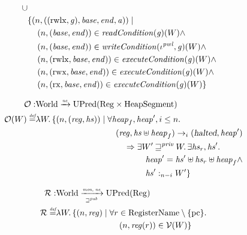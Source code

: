 \documentclass[a4paper]{article}
\newcommand{\nefun}{\xrightarrow{\textit{\tiny{ne}}}}
\newcommand{\defeq}{\stackrel{\textit{\tiny{def}}}{=}}
\newcommand{\union}{\mathbin{\cup}}
\newcommand{\var}[1]{\mathit{#1}}
\newcommand{\hs}{\var{hs}}
\newcommand{\gl}{\var{g}}
\newcommand{\pcreg}{\mathrm{pc}}
\newcommand{\addr}{\var{a}}
\newcommand{\start}{\var{base}}
\newcommand{\addrend}{\var{end}}
\newcommand{\reg}{\var{reg}}
\newcommand{\heap}{\var{heap}}
\newcommand{\perm}{\var{perm}}
\newcommand{\stdcap}[1][(\perm,\gl)]{\left(#1,\start,\addrend,\addr \right)}
\newcommand{\halted}{\textsl{halted}}
\newcommand{\plainfun}[2]{
  \ifthenelse{\equal{#2}{}}
             {\mathit{#1}}
             {\mathit{#1}(#2)}
}
\newcommand{\readCond}[1]{\plainfun{readCondition}{#1}}
\newcommand{\writeCond}[1]{\plainfun{writeCondition}{#1}}
\newcommand{\execCond}[1]{\plainfun{executeCondition}{#1}}
\newcommand{\futurewk}{\mathbin{\sqsupseteq}^{\var{pub}}}
\newcommand{\futurestr}{\mathbin{\sqsupseteq}^{\var{priv}}}
\newcommand{\heapSat}[3][\heap]{#1 :_{#2} #3}
\newcommand{\monwknefun}{\xrightarrow[\text{\tiny{$\futurewk$}}]{\textit{\tiny{mon, ne}}}}
\newcommand{\asmType}{\plaindom{AsmType}}
\newcommand{\plaindom}[1]{\mathrm{#1}}
\newcommand{\RegName}{\plaindom{RegisterName}}
\newcommand{\Regs}{\plaindom{Reg}}
\newcommand{\HeapSegments}{\plaindom{HeapSegment}}
\newcommand{\Worlds}{\plaindom{World}}
\newcommand{\UPred}[1]{\plaindom{UPred}(#1)}
\newcommand{\intr}[2]{\mathcal{#1}}
\newcommand{\valueintr}[1]{\intr{V}{#1}}
\newcommand{\regintr}[1]{\intr{R}{#1}}
\newcommand{\stdvr}{\valueintr{\asmType}}
\newcommand{\stdrr}{\regintr{\asmType}}
\newcommand{\observations}{\mathcal{O}}
\newcommand{\npair}[2][n]{\left(#1,#2 \right)}
\newcommand{\plainperm}[1]{\mathrm{#1}}
\newcommand{\exec}{\plainperm{rx}}
\newcommand{\rwx}{\plainperm{rwx}}
\newcommand{\rwlx}{\plainperm{rwlx}}
\newcommand{\step}[1][]{\rightarrow_{#1}}
\begin{document}
\begin{align*}
\begin{aligned}[t]
             \union \\
             & \{ \npair{\stdcap[(\rwlx,\gl)]} \mid \\
             & \quad \npair{(\start,\addrend)} \in \readCond{}(\gl)(W) \land \\
             & \quad \npair{(\start,\addrend)} \in \writeCond{}(\iota^{\var{pwl}},\gl)(W) \land\\
             & \quad \npair{(\rwlx,\start,\addrend)} \in \execCond{}(\gl)(W) \land \\
             & \quad \npair{(\rwx,\start,\addrend)} \in \execCond{}(\gl)(W) \land \\
             & \quad \npair{(\exec,\start,\addrend)} \in \execCond{}(\gl)(W) \}
           \end{aligned}
\end{align*}

\begin{align*}
  \observations : &  \Worlds \nefun \UPred{\Regs \times \HeapSegments} \\
  \observations (W) \defeq & \lambda W \ldotp 
                               \{ \npair{(\reg,\hs)} \mid
                             \begin{aligned}[t]
                               & \forall \heap_f, \heap', i \leq n \ldotp \\
                               & \quad(\reg,\hs \uplus \heap_f) \step[i] (\halted,\heap')  \\
                               & \qquad \Rightarrow
                               \begin{aligned}[t]
                                 & \exists W' \futurestr W \ldotp\exists \hs_r, \hs' \ldotp\\
                                 & \quad \heap' = \hs' \uplus \hs_r \uplus \heap_f \land \\ 
                                 & \quad \heapSat[\hs']{n-i}{W'} \}
                               \end{aligned}
                             \end{aligned}
\end{align*}

\begin{align*}
  \stdrr : & \Worlds \monwknefun \UPred{\Regs} \\
  \stdrr \defeq & \lambda W \ldotp
                     \begin{aligned}[t]
                       \{ \npair{\reg} \mid & \;\forall r \in \RegName \setminus \{\pcreg\} \ldotp \\
                                            & \;\quad  \npair{\reg(r)} \in \stdvr(W) \}
                     \end{aligned}
\end{align*}
\end{document}
